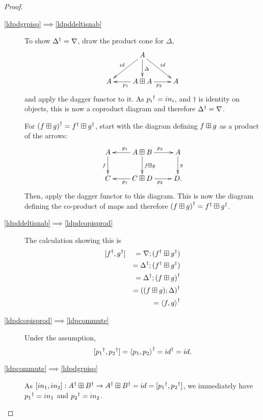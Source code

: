 \begin{proof}
  \begin{description}
    \item[\ref{ldpdgrpisq}$\implies$\ref{ldpddeltisnab}] To show ${\Delta}^{\dagger} = \nabla$,
    draw the product cone for $\Delta$,
    \[
      \xymatrix {
        &A \ar[d]^{\Delta} \ar[dr]^{id} \ar[dl]_{id}\\
        A
         & A\biproduct A \ar[l]^{p_{1}}  \ar[r]_{p_{2}}
         & A
      }
    \]
    and apply the dagger functor to it. As ${p_{i}}^{\dagger} = in_{i}$, and $\dagger$ is identity on
    objects, this is now a coproduct diagram and therefore ${\Delta}^{\dagger} = \nabla$.

    For ${(f\boxplus g)}^{\dagger} = {f}^{\dagger}\boxplus{g}^{\dagger}$, start with the diagram defining
    $f\boxplus g$ as a product of the arrows:
    \[
      \xymatrix{
        A\ar[d]_{f}  & A\biproduct B \ar[l]_{p_{1}} \ar[r]^{p_{2}} \ar[d]^{f\biproduct g}&A \ar[d]^{g}\\
        C & C\biproduct D \ar[l]^{p_{1}} \ar[r]_{p_{2}}  & D.
      }
    \]
    Then, apply the dagger functor to this diagram. This is now the diagram defining the
    co-product of maps and therefore ${(f\boxplus g)}^{\dagger} = {f}^{\dagger}\boxplus{g}^{\dagger}$.
    \item[\ref{ldpddeltisnab}$\implies$\ref{ldpdcopisprod}] The calculation showing this is
      \begin{eqnarray*}
        &[{f}^{\dagger},{g}^{\dagger}] & = \nabla; ({f}^{\dagger}\boxplus {g}^{\dagger})\\
        & &={\Delta}^{\dagger}; ({f}^{\dagger}\boxplus {g}^{\dagger})\\
        & &={\Delta}^{\dagger}; {(f\boxplus g)}^{\dagger}\\
        & & = {((f\boxplus g);\Delta)}^{\dagger}\\
        & & = {\langle f,g\rangle}^{\dagger}
      \end{eqnarray*}
    \item[\ref{ldpdcopisprod}$\implies$\ref{ldpcommute}]
      Under the assumption,
      \[
        [{p_{1}}^{\dagger},{p_{2}}^{\dagger}] = {\langle p_{1},p_{2}\rangle}^{\dagger}={id}^{\dagger}=id.
      \]
    \item[\ref{ldpcommute}$\implies$\ref{ldpdgrpisq}] As $[in_{1},in_{2}]:{A}^{\dagger} \boxplus {B}^{\dagger}
      \to {A}^{\dagger} \boxplus {B}^{\dagger} = id = [{p_{1}}^{\dagger},{p_{2}}^{\dagger}]$, we immediately have
      ${p_{1}}^{\dagger} = in_{1}$ and ${p_{2}}^{\dagger} = in_{2}$.
%
  \end{description}
\end{proof}

